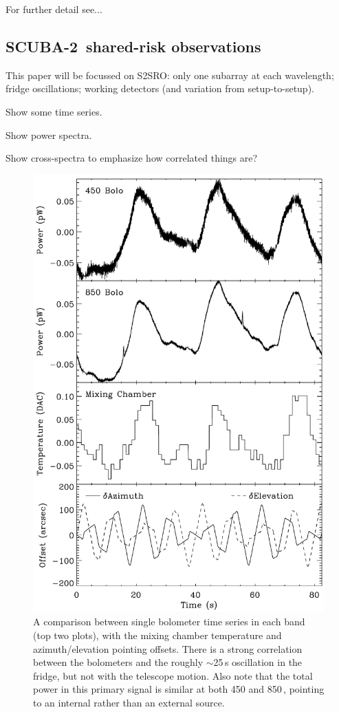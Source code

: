 \documentclass[useAMS,usenatbib,nofootinbib]{mn2e}
\newcommand{\scuba}{SCUBA-2}
\begin{document}
For further detail see...

\subsection{\scuba\ shared-risk observations}

This paper will be focussed on S2SRO: only one subarray at each
wavelength; fridge oscillations; working detectors (and variation from
setup-to-setup).

Show some time series.

Show power spectra.

Show cross-spectra to emphasize how correlated things are?

\begin{figure}
\centering
\includegraphics[width=\linewidth]{bolos_point_mix.pdf}
\caption{A comparison between single bolometer time series in each
  band (top two plots), with the mixing chamber temperature and
  azimuth/elevation pointing offsets. There is a strong correlation
  between the bolometers and the roughly $\sim$25\,s oscillation in
  the fridge, but not with the telescope motion. Also note that the
  total power in this primary signal is similar at both 450 and
  850\,\micron, pointing to an internal rather than an external
  source.}
\label{fig:bolos_mix}
\end{figure}
\end{document}
